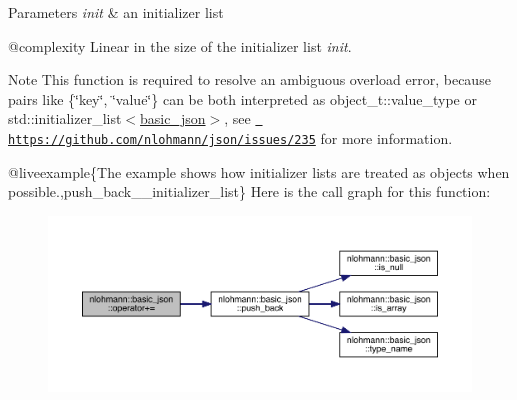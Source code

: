 \begin{DoxyParams}{Parameters}
{\em init} & an initializer list\\
\hline
\end{DoxyParams}
@complexity Linear in the size of the initializer list {\itshape init}.

\begin{DoxyNote}{Note}
This function is required to resolve an ambiguous overload error, because pairs like {\ttfamily \{\char`\"{}key\char`\"{}, \char`\"{}value\char`\"{}\}} can be both interpreted as {\ttfamily object\+\_\+t\+::value\+\_\+type} or {\ttfamily std\+::initializer\+\_\+list$<$\mbox{\hyperlink{classnlohmann_1_1basic__json}{basic\+\_\+json}}$>$}, see \href{https://github.com/nlohmann/json/issues/235}{\texttt{ https\+://github.\+com/nlohmann/json/issues/235}} for more information.
\end{DoxyNote}
@liveexample\{The example shows how initializer lists are treated as objects when possible.,push\+\_\+back\+\_\+\+\_\+initializer\+\_\+list\} Here is the call graph for this function\+:
\nopagebreak
\begin{figure}[H]
\begin{center}
\leavevmode
\includegraphics[width=350pt]{classnlohmann_1_1basic__json_a0cf23e7d44e78bb9014484971af2f40f_cgraph}
\end{center}
\end{figure}
\mbox{\label{classnlohmann_1_1basic__json_aab256df8c5594ec693035822fa1e2904}} 
